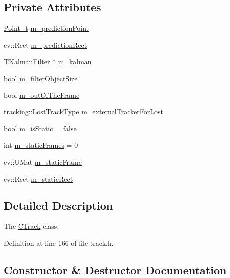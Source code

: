 \subsection*{Private Attributes}
\begin{DoxyCompactItemize}
\item 
\mbox{\hyperlink{defines_8h_a8c42696da8f098b91374a8e8bb84b430}{Point\+\_\+t}} \mbox{\hyperlink{class_c_track_a8ee3f8baaf290aeb113f34c26a446a76}{m\+\_\+prediction\+Point}}
\item 
cv\+::\+Rect \mbox{\hyperlink{class_c_track_aeab9c3c95a6d988918f5874a8910b90b}{m\+\_\+prediction\+Rect}}
\item 
\mbox{\hyperlink{class_t_kalman_filter}{T\+Kalman\+Filter}} $\ast$ \mbox{\hyperlink{class_c_track_a8d676e67fb1b5cae95cc7db3cdc24f5f}{m\+\_\+kalman}}
\item 
bool \mbox{\hyperlink{class_c_track_a5573dab5b9fe2e5143204355b8146c87}{m\+\_\+filter\+Object\+Size}}
\item 
bool \mbox{\hyperlink{class_c_track_ad97c3e53969dbb60e7690c4f2d038172}{m\+\_\+out\+Of\+The\+Frame}}
\item 
\mbox{\hyperlink{namespacetracking_a5377d69122ad915004ef68a518d22be3}{tracking\+::\+Lost\+Track\+Type}} \mbox{\hyperlink{class_c_track_a7d1f6c9d8d56790a28a7139e85896dc8}{m\+\_\+external\+Tracker\+For\+Lost}}
\item 
bool \mbox{\hyperlink{class_c_track_a37f858466a4c5de19eea18ab829e4745}{m\+\_\+is\+Static}} = false
\item 
int \mbox{\hyperlink{class_c_track_abafeef3579e8b8ee12dd6e8c788c368e}{m\+\_\+static\+Frames}} = 0
\item 
cv\+::\+U\+Mat \mbox{\hyperlink{class_c_track_a87bfcad44f8da34b2411733ed5ddcbae}{m\+\_\+static\+Frame}}
\item 
cv\+::\+Rect \mbox{\hyperlink{class_c_track_abbec66a84ee65ce5d6390565698e5156}{m\+\_\+static\+Rect}}
\end{DoxyCompactItemize}


\subsection{Detailed Description}
The \mbox{\hyperlink{class_c_track}{C\+Track}} class. 

Definition at line 166 of file track.\+h.



\subsection{Constructor \& Destructor Documentation}
\mbox{\label{class_c_track_a4c79152aa6d38a03c6fa80b2b3510808}} 
